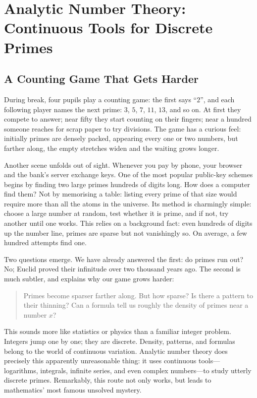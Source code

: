 \chapter{Analytic Number Theory: Continuous Tools for Discrete Primes}

\section{A Counting Game That Gets Harder}

During break, four pupils play a counting game: the first says ``$2$'', and each following player names the next prime: $3$, $5$, $7$, $11$, $13$, and so on. At first they compete to answer; near fifty they start counting on their fingers; near a hundred someone reaches for scrap paper to try divisions. The game has a curious feel: initially primes are densely packed, appearing every one or two numbers, but farther along, the empty stretches widen and the waiting grows longer.

Another scene unfolds out of sight. Whenever you pay by phone, your browser and the bank's server exchange keys. One of the most popular public-key schemes begins by finding two large primes hundreds of digits long. How does a computer find them? Not by memorising a table: listing every prime of that size would require more than all the atoms in the universe. Its method is charmingly simple: choose a large number at random, test whether it is prime, and if not, try another until one works. This relies on a background fact: even hundreds of digits up the number line, primes are sparse but not vanishingly so. On average, a few hundred attempts find one.

Two questions emerge. We have already answered the first: do primes run out? No; Euclid proved their infinitude over two thousand years ago. The second is much subtler, and explains why our game grows harder:

\begin{quote}
Primes become sparser farther along. But how sparse? Is there a pattern to their thinning? Can a formula tell us roughly the density of primes near a number $x$?
\end{quote}

This sounds more like statistics or physics than a familiar integer problem. Integers jump one by one; they are discrete. Density, patterns, and formulas belong to the world of continuous variation. Analytic number theory does precisely this apparently unreasonable thing: it uses continuous tools---logarithms, integrals, infinite series, and even complex numbers---to study utterly discrete primes. Remarkably, this route not only works, but leads to mathematics' most famous unsolved mystery.

